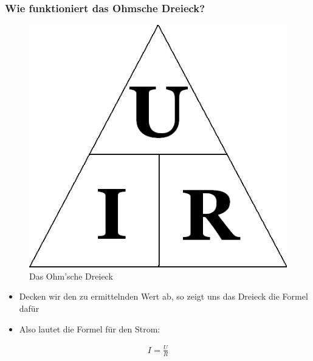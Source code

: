 \begin{frame}
  \frametitle{Wie funktioniert das Ohmsche Dreieck?}
  \begin{center}
    \begin{figure}
      \includegraphics[width=\textwidth,height=.4\textheight,keepaspectratio]{e03/Ohm_law_triangle.png}
      \caption{Das Ohm'sche Dreieck \cite{dreieck}}
      \label{fig_dreieck}
    \end{figure}
  \end{center}
  \begin{itemize}
    \item Decken wir den zu ermittelnden Wert ab, so zeigt uns das Dreieck die Formel dafür
    \item Also lautet die Formel für den Strom:
  \end{itemize}
  \begin{align}
    I = \frac{U}{R}
    \label{equ:Strom}
  \end{align}
\end{frame}

